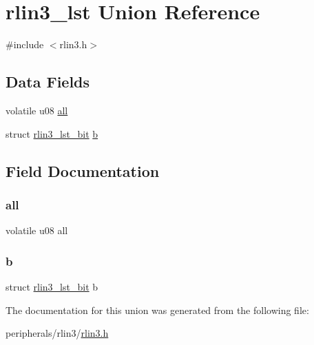 \hypertarget{unionrlin3__lst}{}\section{rlin3\+\_\+lst Union Reference}
\label{unionrlin3__lst}


{\ttfamily \#include $<$rlin3.\+h$>$}

\subsection*{Data Fields}
\begin{DoxyCompactItemize}
\item 
volatile u08 \mbox{\hyperlink{unionrlin3__lst_a38c4e44ae84c133f8be54b77d93f7279}{all}}
\item 
struct \mbox{\hyperlink{structrlin3__lst__bit}{rlin3\+\_\+lst\+\_\+bit}} \mbox{\hyperlink{unionrlin3__lst_aa36f61f47cf77a52b0ab1e6563cfb64b}{b}}
\end{DoxyCompactItemize}


\subsection{Field Documentation}
\mbox{\label{unionrlin3__lst_a38c4e44ae84c133f8be54b77d93f7279}} 
\subsubsection{\texorpdfstring{all}{all}}
{\footnotesize\ttfamily volatile u08 all}

\mbox{\label{unionrlin3__lst_aa36f61f47cf77a52b0ab1e6563cfb64b}} 
\subsubsection{\texorpdfstring{b}{b}}
{\footnotesize\ttfamily struct \mbox{\hyperlink{structrlin3__lst__bit}{rlin3\+\_\+lst\+\_\+bit}} b}



The documentation for this union was generated from the following file\+:\begin{DoxyCompactItemize}
\item 
peripherals/rlin3/\mbox{\hyperlink{rlin3_8h}{rlin3.\+h}}\end{DoxyCompactItemize}
